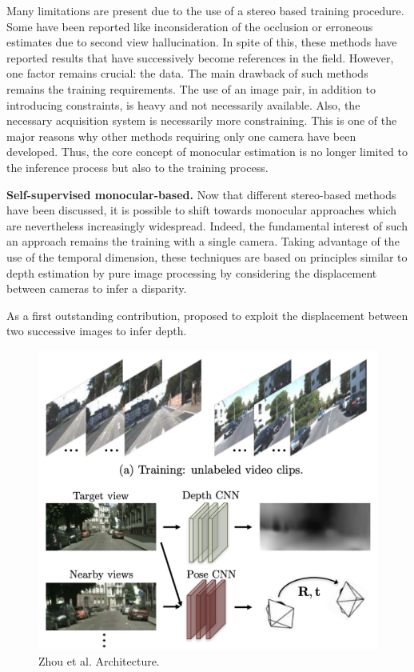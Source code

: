 Many limitations are present due to the use of a stereo based training procedure. Some have been reported like inconsideration of the occlusion or erroneous estimates due to second view hallucination.
In spite of this, these methods have reported results that have successively become references in the field. However, one factor remains crucial: the data. The main drawback of such methods remains the training requirements. The use of an image pair, in addition to introducing constraints, is heavy and not necessarily available. Also, the necessary acquisition system is necessarily more constraining.
This is one of the major reasons why other methods requiring only one camera have been developed. Thus, the core concept of monocular estimation is no longer limited to the inference process but also to the training process.

\textbf{Self-supervised monocular-based. }Now that different stereo-based methods have been discussed, it is possible to shift towards monocular approaches which are nevertheless increasingly widespread.
Indeed, the fundamental interest of such an approach remains the training with a single camera. Taking advantage of the use of the temporal dimension, these techniques are based on principles similar to depth estimation by pure image processing by considering the displacement between cameras to infer a disparity. 

As a first outstanding contribution, \cite{zhou2017unsupervised} proposed to exploit the displacement between two successive images to infer depth. 

\begin{figure}[h]
	\centering
	\includegraphics[width=0.5\linewidth]{Figures/SOA/illuzhou2017}
	\caption[Zhou et al. Architecture.]{Zhou et al.\cite{zhou2017unsupervised} Architecture.}
	\label{illuzhou2017}
\end{figure}

